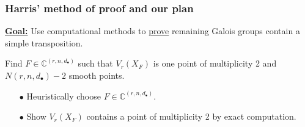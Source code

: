 \documentclass{beamer}
\theoremstyle{definition}
\begin{document}
\begin{frame}
\frametitle{Harris' method of proof and our plan}



\textbf{\underline{Goal:}} Use computational methods to \underline{prove} remaining Galois groups contain a simple transposition.

\vspace{.2cm}

\begin{minipage}{.65\textwidth}
Find $F\in\mathbb{C}^{(r,n,d_\bullet)}$ such that $V_r(X_F)$ is one point of multiplicity 2 and $N(r,n,d_\bullet)-2$ smooth points.
\begin{enumerate}
\item[$\bullet$] Heuristically choose $F\in\mathbb{C}^{(r,n,d_\bullet)}$.

\item[$\bullet$] Show $V_r(X_F)$ contains a point of multiplicity 2 by exact computation.


\end{enumerate}
\end{minipage}
\end{frame}
\end{document}
